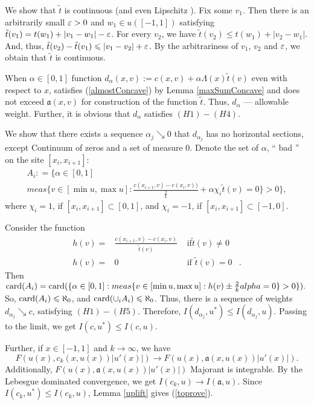 We show that $\tilde{t}$ is continuous (and even Lipschitz ).
Fix some $v_1$.
Then there is an arbitrarily small $\varepsilon > 0$ and $w_1 \in u([-1, 1])$
satisfying $\tilde{t}(v_1) = t(w_1) + |v_1 - w_1| - \varepsilon$.
For every $v_2$, we have $\tilde{t}(v_2) \le t(w_1) + |v_2 - w_1|$.
And, thus, $\tilde{t}(v_2) - \tilde{t}(v_1) \leqslant |v_1 - v_2| + \varepsilon$.
By the arbitrariness of $v_1$, $v_2$ and $\varepsilon$, we obtain that $\tilde{t}$ is continuous.

When $\alpha \in [0, 1]$ function $d_\alpha(x, v) := c(x, v) + \alpha \Lambda(x) \tilde{t}(v)$
even with respect to $x$, satisfies (\ref{almostConcave}) by Lemma \ref{maxSumConcave}
and does not exceed $\mathfrak a(x, v)$ for construction of the function $\tilde{t}$.
Thus, $d_\alpha$ --- allowable weight.
Further, it is obvious that $d_\alpha$ satisfies $(H1)-(H4)$.

We show that there exists a sequence $\alpha_j \searrow 0$
that $d_{\alpha_j}$ has no horizontal sections, except
Continuum of zeros and a set of measure $0$.
Denote the set of $\alpha$, `` bad '' on the site $[x_i, x_{i + 1}]$:
\begin{multline*}
A_i: = \big \{\alpha \in [ 0, 1 ] \\
meas \{v \in [\min u, \max u]: \frac{c (x_{i + 1}, v) - c (x_i, v))}{\frac{2}{k}} + \alpha \chi_i \tilde{t} (v) = 0 \} > 0 \big \},
\end{multline*}
where $\chi_i = 1$, if $[x_i, x_{i + 1}] \subset [0, 1]$, and $\chi_i = -1$, if $[x_i, x_{i + 1}] \subset [-1, 0]$.

Consider the function
$$
\begin{aligned}
h (v) = & \frac{c (x_{i + 1}, v) - c (x_i, v)}{\tilde{t} (v)} & \text{ if} \tilde{t} ( v) \neq 0 & \\
h (v) = & 0 & \text{ if } \tilde{t} (v) = 0 &.
\end{aligned}
$$
Then $\card(A_i) = \card(\{ \alpha \in [0, 1]: meas \{ v \in [\min u, \max u]: h(v) \pm \frac{2}{k}\\alpha = 0 \} > 0 \}).$
So, ${\rm card}(A_i) \leqslant \aleph_0$, and ${\rm card}(\cup_i A_i) \leqslant \aleph_0$.
Thus, there is a sequence of weights $d_{\alpha_j} \searrow c$, satisfying $(H1)-(H5)$.
Therefore, $I(d_{\alpha_j}, u^*) \le I(d_{\alpha_j}, u)$.
Passing to the limit, we get $I(c, u^*) \le I(c, u)$.

Further, if $x \in [-1, 1]$ and $k \to \infty$, we have
$$F(u(x), c_k(x, u(x)) |u'(x)|) \to F(u(x), \mathfrak a(x, u(x)) |u'(x)|).$$
Additionally, $F(u(x), \mathfrak a(x, u(x)) |u'(x)|)$ Majorant is integrable.
By the Lebesgue dominated convergence, we get $I(c_k, u) \to I(\mathfrak a, u)$.
Since $I(c_k, u^*) \le I(c_k, u)$, Lemma \ref{uplift} gives (\ref{toprove}).


